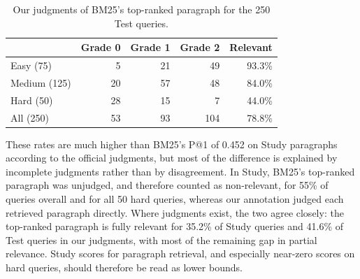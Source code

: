 \documentclass[sigconf,nonacm]{acmart}
\begin{document}
\begin{table}[t]
  \caption{Our judgments of BM25's top-ranked paragraph for the 250 Test
    queries.}
  \label{tab:annotation}
  \small
  \begin{tabular}{lrrrr}
    \toprule
    & Grade 0 & Grade 1 & Grade 2 & Relevant \\
    \midrule
    Easy (75)     & 5  & 21 & 49  & 93.3\% \\
    Medium (125)  & 20 & 57 & 48  & 84.0\% \\
    Hard (50)     & 28 & 15 & 7   & 44.0\% \\
    \midrule
    All (250)     & 53 & 93 & 104 & 78.8\% \\
    \bottomrule
  \end{tabular}
\end{table}

These rates are much higher than BM25's P@1 of 0.452 on Study paragraphs
according to the official judgments, but most of the difference is
explained by incomplete judgments rather than by disagreement. In Study,
BM25's top-ranked paragraph was unjudged, and therefore counted as
non-relevant, for 55\% of queries overall and for all 50 hard queries,
whereas our annotation judged each retrieved paragraph directly. Where
judgments exist, the two agree closely: the top-ranked paragraph is fully
relevant for 35.2\% of Study queries and 41.6\% of Test queries in our
judgments, with most of the remaining gap in partial relevance. Study
scores for paragraph retrieval, and especially near-zero scores on hard
queries, should therefore be read as lower bounds.
\end{document}
